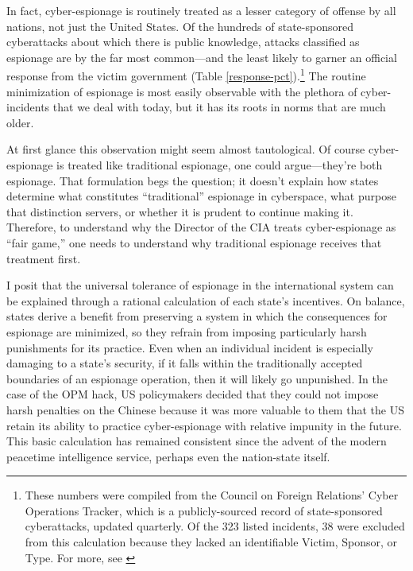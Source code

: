\documentclass[14pt]{extarticle}
\begin{document}
In fact, cyber-espionage is routinely treated as a lesser category of offense by all nations, not just the United States. Of the hundreds of state-sponsored cyberattacks about which there is public knowledge, attacks classified as espionage are by the far most common---and the least likely to garner an official response from the victim government (Table \ref{response-pct}).\footnote{These numbers were compiled from the Council on Foreign Relations' Cyber Operations Tracker, which is a publicly-sourced record of state-sponsored cyberattacks, updated quarterly. Of the 323 listed incidents, 38 were excluded from this calculation because they lacked an identifiable Victim, Sponsor, or Type. For more, see \cite{council_on_foreign_relations_new_2019}} The routine minimization of espionage is most easily observable with the plethora of cyber-incidents that we deal with today, but it has its roots in norms that are much older.

At first glance this observation might seem almost tautological. Of course cyber-espionage is treated like traditional espionage, one could argue---they're both espionage. That formulation begs the question; it doesn't explain how states determine what constitutes \enquote{traditional} espionage in cyberspace, what purpose that distinction servers, or whether it is prudent to continue making it. Therefore, to understand why the Director of the CIA treats cyber-espionage as \enquote{fair game,} one needs to understand why traditional espionage receives that treatment first.

I posit that the universal tolerance of espionage in the international system can be explained through a rational calculation of each state's incentives. On balance, states derive a benefit from preserving a system in which the consequences for espionage are minimized, so they refrain from imposing particularly harsh punishments for its practice. Even when an individual incident is especially damaging to a state's security, if it falls within the traditionally accepted boundaries of an espionage operation, then it will likely go unpunished. In the case of the OPM hack, US policymakers decided that they could not impose harsh penalties on the Chinese because it was more valuable to them that the US retain its ability to practice cyber-espionage with relative impunity in the future. This basic calculation has remained consistent since the advent of the modern peacetime intelligence service, perhaps even the nation-state itself.
\end{document}
